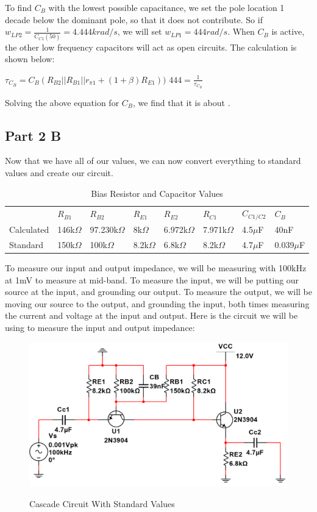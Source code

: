 \documentclass[12pt]{article}
\begin{document}
To find $C_B$ with the lowest possible capacitance, we set the pole location 1 decade below the dominant pole, so that it does not contribute. So if $w_{LP2} = \frac{1}{C_{C1}(50)} = 4.444k rad/s$, we will set $w_{LP1} = 444 rad/s$. When $C_B$ is active, the other low frequency capacitors will act as open circuits. The calculation is shown below:
\begin{center}
$\tau_{C_B} = C_B(R_{B2}||R_{B1}||r_{\pi1}+(1+\beta)R_{E1}))$
\newline
$444=\frac{1}{\tau_{C_B}}$
\end{center}
Solving the above equation for $C_B$, we find that it is about .

\subsection{Part 2 B}
Now that we have all of our values, we can now convert everything to standard values and create our circuit.



\begin{table}[h!]
\centering
\begin{tabular}{l|l|l|l|l|l|l|l}

           & $R_{B1}$     & $R_{B2}$        & $R_{E1}$     & $R_{E2}$       & $R_{C1}$       & $C_{C1/C2}$ & $C_B$       \\ \cline{2-8}
Calculated & 146k$\Omega$ & 97.230k$\Omega$ & 8k$\Omega$   & 6.972k$\Omega$ & 7.971k$\Omega$ & 4.5$\mu$F   & 40nF        \\
Standard   & 150k$\Omega$ & 100k$\Omega$    & 8.2k$\Omega$ & 6.8k$\Omega$   & 8.2k$\Omega$   & 4.7$\mu$F   & 0.039$\mu$F
\end{tabular}
\caption{Bias Resistor and Capacitor Values}
\label{Bias Resistor and Capacitor Values}
\end{table}
To measure our input and output impedance, we will be measuring with 100kHz at 1mV to measure at mid-band. To measure the input, we will be putting our source at the input, and grounding our output. To measure the output, we will be moving our source to the output, and grounding the input, both times measuring the current and voltage at the input and output.
Here is the circuit we will be using to measure the input and output impedance:
\begin{figure}[h!]
\centering
\includegraphics[height=0.25\textwidth]{Images/part_2_sim.png}\\
\caption{Cascade Circuit With Standard Values}
\label{fig:cascadecircuit}
\end{figure}
\end{document}
